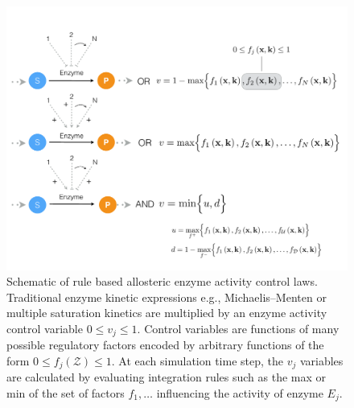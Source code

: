 \documentclass[12pt]{article}
\begin{document}
\begin{figure}
\centering
\includegraphics[width=1.0\textwidth]{./figs/Figure-2-ControlSchematic.pdf}
\caption{Schematic of rule based allosteric enzyme activity control laws. 
Traditional enzyme kinetic expressions e.g., Michaelis–Menten or multiple saturation kinetics are multiplied by an enzyme activity control variable $0 \leq v_{j} \leq 1 $. 
Control variables are functions of many possible regulatory factors encoded by arbitrary functions of the form $0\leq f_{j}\left(\mathcal{Z}\right)\leq 1$.
At each simulation time step, the $v_{j}$ variables are calculated by evaluating integration rules such as the max or min of the set of factors $f_{1},\hdots$ 
influencing the activity of enzyme $E_{j}$. }\label{fig-control-schematic}
\end{figure}

\clearpage
\end{document}
